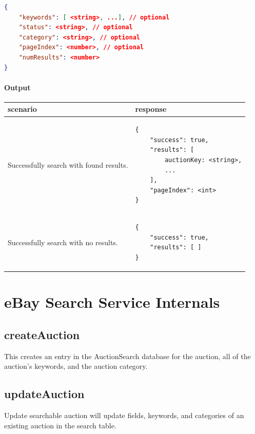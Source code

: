 \documentclass[12pt,a4paper]{article}
\begin{document}
\begin{lstlisting}[language=json,numbers=none]
{
    "keywords": [ <string>, ...], // optional
    "status": <string>, // optional
    "category": <string>, // optional
    "pageIndex": <number>, // optional
    "numResults": <number>
}
\end{lstlisting}

\paragraph{Output}
\begin{center}
    \begin{tabular}{| p{7cm} | l |}
        \hline
        \textbf{scenario} & \textbf{response} \\
        \hline
        Successfully search with found results. &
        \begin{lstlisting}[language=tablejson,firstnumber=1]
{
    "success": true,
    "results": [ 
        auctionKey: <string>,
        ...
    ],
    "pageIndex": <int>
}
        \end{lstlisting} \\ 
        \hline
 \hline
        Successfully search with no results. &
        \begin{lstlisting}[language=tablejson,firstnumber=1]
{
    "success": true,
    "results": [ ]
}
         \end{lstlisting} \\ 
         \hline
    \end{tabular}
\end{center}

\pagebreak
\section{eBay Search Service Internals}
\subsection{createAuction}
This creates an entry in the AuctionSearch database for the auction, all of the
auction's keywords, and the auction category.

\subsection{updateAuction}
Update searchable auction will update fields, keywords, and categories of an
existing auction in the search table.
\end{document}
